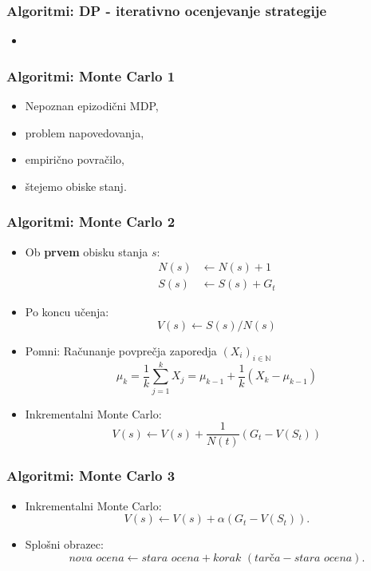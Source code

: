 \documentclass{beamer}    %
\begin{document}
\begin{frame}
    \frametitle{Algoritmi: DP - iterativno ocenjevanje strategije}
    \begin{itemize}
        \item   
    \end{itemize}
\end{frame}


\begin{frame}
    \frametitle{Algoritmi: Monte Carlo 1}
    \begin{itemize}
        \item Nepoznan epizodični MDP, 
        \item problem napovedovanja, 
        \item empirično povračilo, 
        \item štejemo obiske stanj.
    \end{itemize}
\end{frame}


\begin{frame}
    \frametitle{Algoritmi: Monte Carlo 2}
    \begin{itemize}
        \item Ob \textbf{prvem} obisku stanja $s$: 
        \begin{align*}
            N(s) &\leftarrow N(s) + 1 \\
            S(s) &\leftarrow S(s) + G_t
        \end{align*}
        \item Po koncu učenja: 
        $$
        V(s) \leftarrow S(s) / N(s)
        $$
       \item Pomni: Računanje povprečja zaporedja $(X_i)_{i \in \mathbb{N}}$
       $$
       \mu_k = \frac{1}{k} \sum_{j=1}^k X_j = \mu_{k-1} + \frac{1}{k} (X_k - \mu_{k-1})
       $$
       \item Inkrementalni Monte Carlo:
       $$
       V(s) \leftarrow V(s) + \frac{1}{N(t)} (G_t - V(S_t))
       $$
    \end{itemize}
\end{frame}


\begin{frame}
    \frametitle{Algoritmi: Monte Carlo 3}
    \begin{itemize}
        \item Inkrementalni Monte Carlo:
                $$
                V(s) \leftarrow V(s) + \alpha (G_t - V(S_t)).
                $$
        \item Splošni obrazec: 
                $$
                \textit{nova ocena} \leftarrow \textit{stara ocena} + \textit{korak } 
                (\textit{tarča} - \textit{stara ocena}).
                $$
    \end{itemize}
\end{frame}
\end{document}
